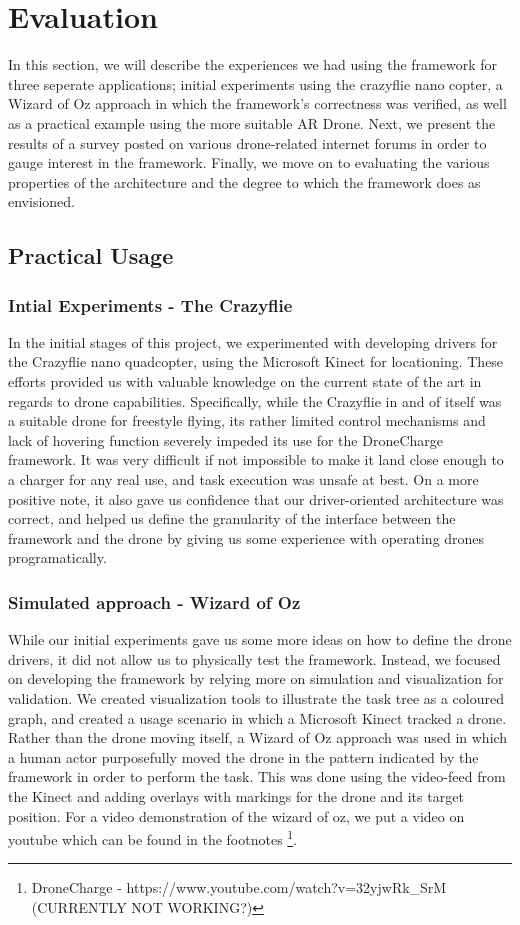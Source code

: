 \section{Evaluation}
In this section, we will describe the experiences we had using the framework for three seperate applications; initial experiments using the crazyflie nano copter, a Wizard of Oz approach in which the framework's correctness was verified, as well as a practical example using the more suitable AR Drone. Next, we present the results of a survey posted on various drone-related internet forums in order to gauge interest in the framework. Finally, we move on to evaluating the various properties of the architecture and the degree to which the framework does as envisioned.

\subsection{Practical Usage}
\subsubsection{Intial Experiments - The Crazyflie}
In the initial stages of this project, we experimented with developing drivers for the Crazyflie nano quadcopter, using the Microsoft Kinect for locationing. These efforts provided us with valuable knowledge on the current state of the art in regards to drone capabilities. Specifically, while the Crazyflie in and of itself was a suitable drone for freestyle flying, its rather limited control mechanisms and lack of hovering function severely impeded its use for the DroneCharge framework. It was very difficult if not impossible to make it land close enough to a charger for any real use, and task execution was unsafe at best. On a more positive note, it also gave us confidence that our driver-oriented architecture was correct, and helped us define the granularity of the interface between the framework and the drone by giving us some experience with operating drones programatically.

\subsubsection{Simulated approach - Wizard of Oz}
While our initial experiments gave us some more ideas on how to define the drone drivers, it did not allow us to physically test the framework. Instead, we focused on developing the framework by relying more on simulation and visualization for validation. We created visualization tools to illustrate the task tree as a coloured graph, and created a usage scenario in which a Microsoft Kinect tracked a drone. Rather than the drone moving itself, a Wizard of Oz approach was used in which a human actor purposefully moved the drone in the pattern indicated by the framework in order to perform the task. This was done using the video-feed from the Kinect and adding overlays with markings for the drone and its target position. For a video demonstration of the wizard of oz, we put a video on youtube which can be found in the footnotes \footnote{DroneCharge - https://www.youtube.com/watch?v=32yjwRk\_SrM (CURRENTLY NOT WORKING?)}.

